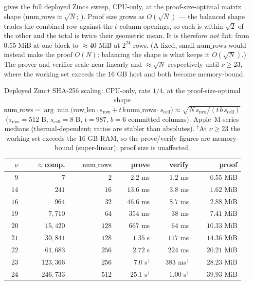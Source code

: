  gives the full deployed Zinc\texttt{+} sweep, CPU-only,
at the proof-size-optimal matrix shape ($\mathrm{num\_rows}\approx\sqrt N$;
). Proof size grows as $O(\sqrt N)$ --- the balanced shape
trades the combined row against the $t$ column openings, so each is within
$\sqrt 2$ of the other and the total is twice their geometric mean. It is
therefore \emph{not} flat: from $0.55$ MiB at one block to $\approx 40$ MiB at
$2^{24}$ rows. (A fixed, small $\mathrm{num\_rows}$ would instead make the
proof $O(N)$; balancing the shape is what keeps it $O(\sqrt N)$.) The prover and
verifier scale near-linearly and $\approx\sqrt N$ respectively until $\nu\ge 23$,
where the working set exceeds the $16$ GB host and both become memory-bound.

\begin{table}[h]
\centering
\renewcommand{\arraystretch}{1.15}
\begin{tabular}{r r r r r r}
\toprule
$\nu$ & $\approx$comp. & $\mathrm{num\_rows}$ & prove & verify & proof \\
\midrule
$9$  & $7$         & $2$   & $2.2$ ms  & $1.2$ ms  & $0.55$ MiB \\
$14$ & $241$       & $16$  & $13.6$ ms & $3.8$ ms  & $1.62$ MiB \\
$16$ & $964$       & $32$  & $46.6$ ms & $8.7$ ms  & $2.88$ MiB \\
$19$ & $7{,}710$   & $64$  & $354$ ms  & $38$ ms   & $7.41$ MiB \\
$20$ & $15{,}420$  & $128$ & $667$ ms  & $64$ ms   & $10.33$ MiB \\
$21$ & $30{,}841$  & $128$ & $1.35$ s  & $117$ ms  & $14.36$ MiB \\
$22$ & $61{,}683$  & $256$ & $2.72$ s  & $224$ ms  & $20.21$ MiB \\
$23$ & $123{,}366$ & $256$ & $7.0$ s$^\dagger$  & $383$ ms$^\dagger$ & $28.23$ MiB \\
$24$ & $246{,}733$ & $512$ & $25.1$ s$^\dagger$ & $1.00$ s$^\dagger$ & $39.93$ MiB \\
\bottomrule
\end{tabular}
\caption{Deployed Zinc\texttt{+} SHA-256 scaling: CPU-only, rate $1/4$, at the
proof-size-optimal shape $\mathrm{num\_rows}=\arg\min\bigl(\mathrm{row\_len}\cdot
s_{\mathrm{row}} + t\,b\,\mathrm{num\_rows}\cdot s_{\mathrm{cell}}\bigr)\approx
\sqrt{N\,s_{\mathrm{row}}/(t\,b\,s_{\mathrm{cell}})}$ ($s_{\mathrm{row}}=512$ B,
$s_{\mathrm{cell}}=8$ B, $t=987$, $b=6$ committed columns). Apple~M-series
medians (thermal-dependent; ratios are stabler than absolutes). $^\dagger$At
$\nu\ge 23$ the working set exceeds the $16$ GB RAM, so the prove/verify figures
are memory-bound (super-linear); proof size is unaffected.}
\label{tab:zinc-scaling}
\end{table}

